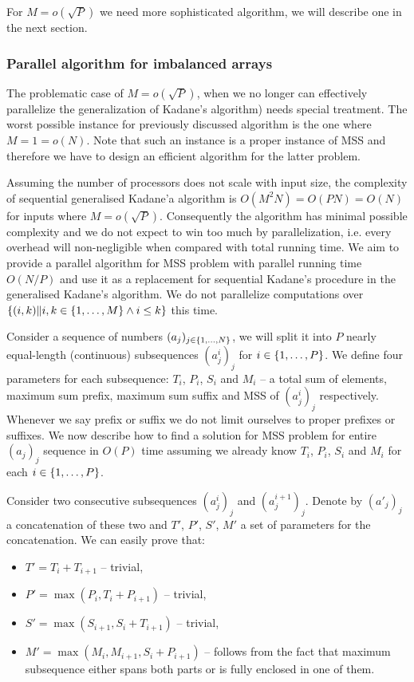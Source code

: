 For $M = o(\sqrt{P})$ we need more sophisticated algorithm, we will describe one in the next section.

\subsubsection*{Parallel algorithm for imbalanced arrays}

The problematic case of $M = o(\sqrt{P})$, when we no longer can effectively parallelize the generalization of Kadane's algorithm) needs special treatment.
The worst possible instance for previously discussed algorithm is the one where $M = 1 = o(N)$.
Note that such an instance is a proper instance of MSS and therefore we have to design an efficient algorithm for the latter problem.

Assuming the number of processors does not scale with input size, the complexity of sequential generalised Kadane'a algorithm is $O(M^2 N) = O(P N) = O(N)$ for inputs where $M = o(\sqrt{P})$.
Consequently the algorithm has minimal possible complexity and we do not expect to win too much by parallelization, i.e. every overhead will non-negligible when compared with total running time. We aim to provide a parallel algorithm for MSS problem with parallel running time $O(N / P)$ and use it as a replacement for sequential Kadane's procedure in the generalised Kadane's algorithm.
We do not parallelize computations over $\{ (i, k) \| i, k \in \{ 1, \dots, M \} \land i \leq k \}$ this time.

Consider a sequence of numbers $(a_j)_{j \in \{ 1, \dots, N \}}$, we will split it into $P$ nearly equal-length (continuous) subsequences $(a^i_j)_j$ for $i \in \{ 1, \dots, P \}$.
We define four parameters for each subsequence: $T_i$, $P_i$, $S_i$ and $M_i$ -- a total sum of elements, maximum sum prefix, maximum sum suffix and MSS of $(a^i_j)_j$ respectively.
Whenever we say prefix or suffix we do not limit ourselves to proper prefixes or suffixes.
We now describe how to find a solution for MSS problem for entire $(a_j)_j$ sequence in $O(P)$ time assuming we already know $T_i$, $P_i$, $S_i$ and $M_i$ for each $i \in \{ 1, \dots, P \}$.

Consider two consecutive subsequences $(a^i_j)_j$ and $(a^{i+1}_j)_j$.
Denote by $(a'_j)_j$ a concatenation of these two and $T'$, $P'$, $S'$, $M'$ a set of parameters for the concatenation.
We can easily prove that:
\begin{itemize}
    \item $T' = T_i + T_{i+1}$ -- trivial,
    \item $P' = \max(P_i, T_i + P_{i+1})$ -- trivial,
    \item $S' = \max(S_{i+1}, S_i + T_{i+1})$ -- trivial,
    \item $M' = \max(M_i, M_{i+1}, S_i + P_{i+1})$ -- follows from the fact that maximum subsequence either spans both parts or is fully enclosed in one of them.
\end{itemize}

